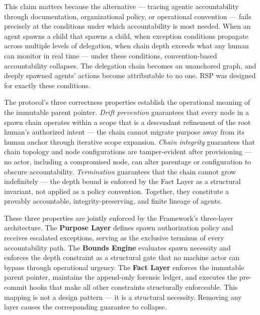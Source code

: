 This claim matters because the alternative — tracing agentic accountability through documentation, organizational policy, or operational convention — fails precisely at the conditions under which accountability is most needed. When an agent spawns a child that spawns a child, when exception conditions propagate across multiple levels of delegation, when chain depth exceeds what any human can monitor in real time — under these conditions, convention-based accountability collapses. The delegation chain becomes an unanchored graph, and deeply spawned agents' actions become attributable to no one. RSP was designed for exactly these conditions.

The protocol's three correctness properties establish the operational meaning of the immutable parent pointer. \textit{Drift prevention} guarantees that every node in a spawn chain operates within a scope that is a descendant refinement of the root human's authorized intent — the chain cannot migrate purpose away from its human anchor through iterative scope expansion. \textit{Chain integrity} guarantees that chain topology and node configurations are tamper-evident after provisioning — no actor, including a compromised node, can alter parentage or configuration to obscure accountability. \textit{Termination} guarantees that the chain cannot grow indefinitely — the depth bound is enforced by the Fact Layer as a structural invariant, not applied as a policy convention. Together, they constitute a provably accountable, integrity-preserving, and finite lineage of agents.

These three properties are jointly enforced by the \bxthree{} Framework's three-layer architecture. The \textbf{Purpose Layer} defines spawn authorization policy and receives escalated exceptions, serving as the exclusive terminus of every accountability path. The \textbf{Bounds Engine} evaluates spawn necessity and enforces the depth constraint as a structural gate that no machine actor can bypass through operational urgency. The \textbf{Fact Layer} enforces the immutable parent pointer, maintains the append-only forensic ledger, and executes the pre-commit hooks that make all other constraints structurally enforceable. This mapping is not a design pattern — it is a structural necessity. Removing any layer causes the corresponding guarantee to collapse.

